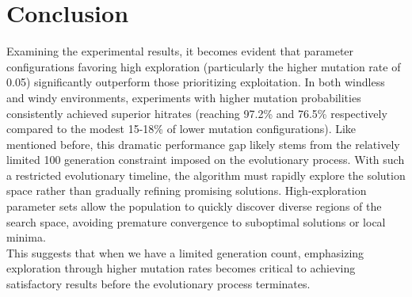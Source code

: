 \documentclass[a4paper, 12pt, fleqn]{report}
\begin{document}
    \section*{Conclusion}
    Examining the experimental results, it becomes evident that parameter configurations favoring high exploration (particularly the higher mutation rate of 0.05) significantly outperform those prioritizing exploitation. In both windless and windy environments, experiments with higher mutation probabilities consistently achieved superior hitrates (reaching 97.2\% and 76.5\% respectively compared to the modest 15-18\% of lower mutation configurations). Like mentioned before, this dramatic performance gap likely stems from the relatively limited 100 generation constraint imposed on the evolutionary process. With such a restricted evolutionary timeline, the algorithm must rapidly explore the solution space rather than gradually refining promising solutions. High-exploration parameter sets allow the population to quickly discover diverse regions of the search space, avoiding premature convergence to suboptimal solutions or local minima.\\
    \noindent
    This suggests that when we have a limited generation count, emphasizing exploration through higher mutation rates becomes critical to achieving satisfactory results before the evolutionary process terminates.
\end{document}
